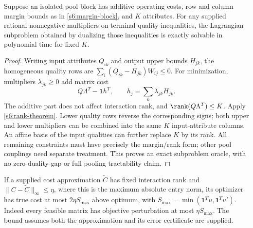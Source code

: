 \begin{corollary}\label{s6:oracle}
Suppose an isolated pool block has additive operating costs, row and
column margin bounds as in \eqref{s6:margin-block}, and $K$ attributes.
For any supplied rational nonnegative multipliers on terminal quality
inequalities, the Lagrangian subproblem obtained by dualizing those
inequalities is exactly solvable in polynomial time for fixed $K$.
\end{corollary}
\begin{proof}
Writing input attributes $Q_{ik}$ and output upper bounds $H_{jk}$,
the homogeneous quality rows are
$\sum_i(Q_{ik}-H_{jk})W_{ij}\le0$.
For minimization, multipliers $\lambda_{jk}\ge0$ add matrix cost
\[
 Q\Lambda^T-\mathbf1 h^T,\qquad h_j=\sum_k\lambda_{jk}H_{jk}.
\]
The additive part does not affect interaction rank, and
$\rank(Q\Lambda^T)\le K$. Apply \cref{s6:rank-theorem}.
Lower quality rows reverse the corresponding signs; both upper and lower
multipliers can be combined into the same $K$ input-attribute columns.
An affine basis of the input qualities can further replace $K$ by its
rank. All remaining constraints must have precisely the margin/rank form;
other pool couplings need separate treatment. This proves an exact
subproblem oracle, with no zero-duality-gap or full pooling tractability
claim.
\end{proof}
If a supplied cost approximation $\widetilde C$ has fixed interaction
rank and $\|C-\widetilde C\|_\infty\le\eta$, where this is the maximum
absolute entry norm, its optimizer has true cost at most
$2\eta S_{\max}$ above optimum, with
$S_{\max}=\min(\mathbf1^Tu,\mathbf1^Tu')$. Indeed every feasible
matrix has objective perturbation at most $\eta S_{\max}$. The bound
assumes both the approximation and its error certificate are supplied.

